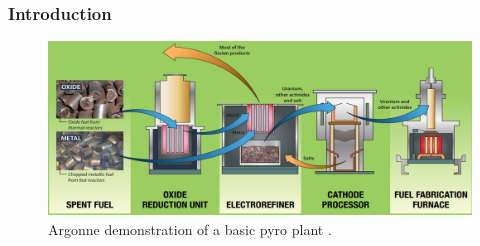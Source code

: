 \begin{frame}
\frametitle{Introduction}
	\begin{figure}
		\centering
		\includegraphics[width=\linewidth]{pyro-background.png}
		\caption{Argonne demonstration of a basic pyro plant \cite{williamson_pyroprocessing_nodate}.}
		\label{fig:pyro}
	\end{figure}
\end{frame}

